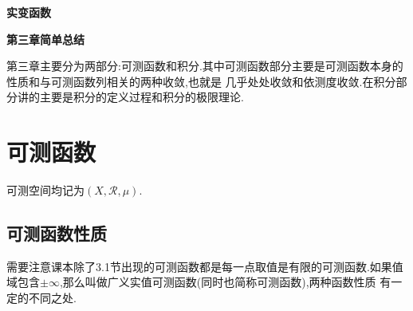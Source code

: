 \documentclass[12pt,a4paper,oneside]{ctexart}
\theoremstyle{nonumberplain}
\theoremstyle{plain}
\theoremstyle{plain}
\theoremstyle{nonumberplain}
\theoremstyle{plain}
\theoremstyle{plain}
\theoremstyle{plain}
\theoremstyle{plain}
\newcommand{\cR}{\mathcal{R}}
\begin{document}
    \begin{titlepage}
        
        %
        \vspace*{3.5cm}
        \begin{center}
            \textbf{\Huge 实变函数}

            \vspace*{0.5cm}

            \textbf{第三章简单总结}
        \end{center}
    \end{titlepage}

    \newpage

    第三章主要分为两部分:可测函数和积分.其中可测函数部分主要是可测函数本身的性质和与可测函数列相关的两种收敛,也就是
    几乎处处收敛和依测度收敛.在积分部分讲的主要是积分的定义过程和积分的极限理论.

    \section{可测函数}

    可测空间均记为$(X,\cR,\mu)$.

    \subsection{可测函数性质}

    需要注意课本除了3.1节出现的可测函数都是每一点取值是有限的可测函数.如果值域包含$\pm \infty$,那么叫做广义实值可测函数(同时也简称可测函数),两种函数性质
    有一定的不同之处.
\end{document}
